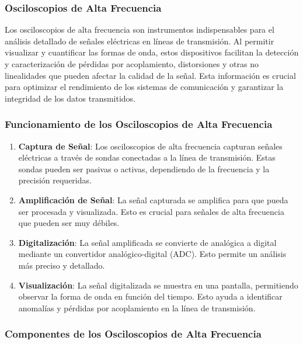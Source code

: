         \subsubsection{Osciloscopios de Alta Frecuencia}

            Los osciloscopios de alta frecuencia son instrumentos indispensables para el análisis detallado de señales eléctricas en líneas de transmisión. Al permitir visualizar y cuantificar las formas de onda, estos dispositivos facilitan la detección y caracterización de pérdidas por acoplamiento, distorsiones y otras no linealidades que pueden afectar la calidad de la señal. Esta información es crucial para optimizar el rendimiento de los sistemas de comunicación y garantizar la integridad de los datos transmitidos.

        \subsubsection*{Funcionamiento de los Osciloscopios de Alta Frecuencia}

            \begin{enumerate}
                \item \textbf{Captura de Señal}: Los osciloscopios de alta frecuencia capturan señales eléctricas a través de sondas conectadas a la línea de transmisión. Estas sondas pueden ser pasivas o activas, dependiendo de la frecuencia y la precisión requeridas.
                \item \textbf{Amplificación de Señal}: La señal capturada se amplifica para que pueda ser procesada y visualizada. Esto es crucial para señales de alta frecuencia que pueden ser muy débiles.
                \item \textbf{Digitalización}: La señal amplificada se convierte de analógica a digital mediante un convertidor analógico-digital (ADC). Esto permite un análisis más preciso y detallado.
                \item \textbf{Visualización}: La señal digitalizada se muestra en una pantalla, permitiendo observar la forma de onda en función del tiempo. Esto ayuda a identificar anomalías y pérdidas por acoplamiento en la línea de transmisión.
            \end{enumerate}

        \subsubsection*{Componentes de los Osciloscopios de Alta Frecuencia}


